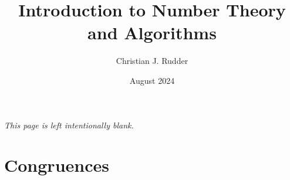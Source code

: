 \documentclass{memoir}
\title{Introduction to Number Theory and Algorithms}
\author{Christian J. Rudder}
\date{August 2024}
\begin{document}
\maketitle
\setcounter{tocdepth}{2}

\tableofcontents

\newpage
\thispagestyle{empty}
\mbox{}
\vfill
\begin{center}
    \textit{This page is left intentionally blank.}
\end{center}
\vfill
\newpage

% 
% 

% 
% 
% 
% 

\chapter{Congruences}






\end{document}
